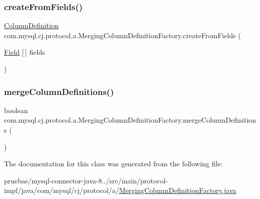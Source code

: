 \subsubsection{\texorpdfstring{create\+From\+Fields()}{createFromFields()}}
{\footnotesize\ttfamily \mbox{\hyperlink{interfacecom_1_1mysql_1_1cj_1_1protocol_1_1_column_definition}{Column\+Definition}} com.\+mysql.\+cj.\+protocol.\+a.\+Merging\+Column\+Definition\+Factory.\+create\+From\+Fields (\begin{DoxyParamCaption}\item[{\mbox{\hyperlink{classcom_1_1mysql_1_1cj_1_1result_1_1_field}{Field}} \mbox{[}$\,$\mbox{]}}]{fields }\end{DoxyParamCaption})}

\mbox{\label{classcom_1_1mysql_1_1cj_1_1protocol_1_1a_1_1_merging_column_definition_factory_ae2d954cccdfe76f992318754af511d61}} 
\subsubsection{\texorpdfstring{merge\+Column\+Definitions()}{mergeColumnDefinitions()}}
{\footnotesize\ttfamily boolean com.\+mysql.\+cj.\+protocol.\+a.\+Merging\+Column\+Definition\+Factory.\+merge\+Column\+Definitions (\begin{DoxyParamCaption}{ }\end{DoxyParamCaption})}



The documentation for this class was generated from the following file\+:\begin{DoxyCompactItemize}
\item 
pruebas/mysql-\/connector-\/java-\/8../src/main/protocol-\/impl/java/com/mysql/cj/protocol/a/\mbox{\hyperlink{_merging_column_definition_factory_8java}{Merging\+Column\+Definition\+Factory.\+java}}\end{DoxyCompactItemize}
